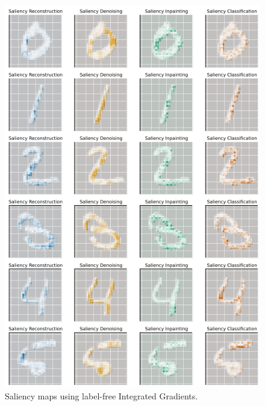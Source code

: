 \begin{figure}[H]
    \centering
    \includegraphics[width=12cm]{images/pretext_saliency_integrated_grads.png}
    \caption{Saliency maps using label-free Integrated Gradients.}
    \label{fig:saliency_maps_pretext_integrated_grads}
\end{figure}

